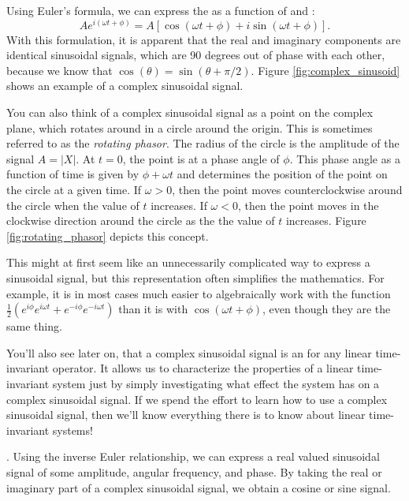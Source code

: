 Using Euler's formula, we can express the  as a function of \index{$\cos$}{$\cos$} and \index{$\sin$}{$\sin$}:
\begin{equation}
Ae^{i(\omega t + \phi)}= A[\cos(\omega t + \phi) + i \sin(\omega t + \phi)].
\end{equation}
With this formulation, it is apparent that the real and imaginary components are identical sinusoidal signals, which are 90 degrees out of phase with each other, because we know that $\cos(\theta)
= \sin(\theta + \pi/2)$. Figure \ref{fig:complex_sinusoid} shows an example of a complex sinusoidal signal.

You can also think of a complex sinusoidal signal as a point on the complex plane, which rotates around in a circle around the origin. This is sometimes referred to as the \emph{rotating phasor}. The radius of the circle is the amplitude of the signal $A=|X|$. At $t=0$, the point is at a phase angle of $\phi$. This phase angle as a function of time is given by $\phi + \omega t$ and determines the position of the point on the circle at a given time. If $\omega>0$, then the point moves counterclockwise around the circle when the value of $t$ increases. If $\omega < 0$, then the point moves
in the clockwise direction around the circle as the the value of $t$ increases. Figure \ref{fig:rotating_phasor} depicts this concept.

This might at first seem like an unnecessarily complicated way to express a sinusoidal signal, but this representation often simplifies the mathematics. For example, it is in most cases much easier to algebraically work with the function $\frac{1}{2}(e^{i\phi}e^{i\omega
t}+e^{-i\phi}e^{-i\omega t})$ than it is with $\cos(\omega t + \phi)$, even though they are the same thing.

You'll also see later on, that a complex sinusoidal signal is
an \emph{} for any linear
time-invariant operator. It allows us to characterize the properties of a linear time-invariant system just by simply investigating what effect the system has on a complex sinusoidal signal. If we spend the effort to learn how to use a complex sinusoidal signal, then we'll know everything there is to know about linear time-invariant systems!

. Using the inverse Euler relationship, we can express a real valued sinusoidal signal of some amplitude, angular frequency, and phase. By taking the real or imaginary part of a complex sinusoidal signal, we obtain a cosine or sine signal.

